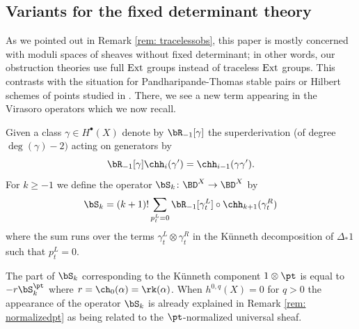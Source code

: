 \subsection{Variants for the fixed determinant theory}
\label{sec: fixeddet}

As we pointed out in Remark \ref{rem: tracelessobs}, this paper is mostly concerned with moduli spaces of sheaves without fixed determinant; in other words, our obstruction theories use full $\textup{Ext}$ groups instead of traceless $\textup{Ext}$ groups. This contrasts with the situation for Pandharipande-Thomas stable pairs or Hilbert schemes of points studied in \cite{moreira}. There, we see a new term appearing in the Virasoro operators which we now recall.

\begin{definition}
\notready
Given a class $\gamma\in H^\bullet(X)$ denote by $\bR_{-1}[\gamma]$ the superderivation (of degree $\deg(\gamma)-2)$ acting on generators by
\[\bR_{-1}[\gamma]\chh_i(\gamma')=\chh_{i-1}(\gamma \gamma').\]
For $k\geq -1$ we define the operator $\bS_k\colon \BD^X\to \BD^X$ by
\[\bS_k=(k+1)!\sum_{p_t^L=0}\bR_{-1}[\gamma_t^L]\circ\chh_{k+1}(\gamma_t^R)\]
where the sum runs over the terms $\gamma_t^L\otimes\gamma_t^R$ in the K\"unneth decomposition of $\Delta_\ast 1$ such that $p_t^L=0$.
\end{definition}
\begin{remark}
\notready
The part of $\bS_k$ corresponding to the K\"unneth component $1\otimes \pt$ is equal to $-r\bS_k^\pt$ where $r=\ch_0(\alpha)=\rk(\alpha)$. When $h^{0, q}(X)=0$ for $q>0$ the appearance of the operator $\bS_k$ is already explained in Remark \ref{rem: normalizedpt} as being related to the $\pt$-normalized universal sheaf.
\end{remark}

